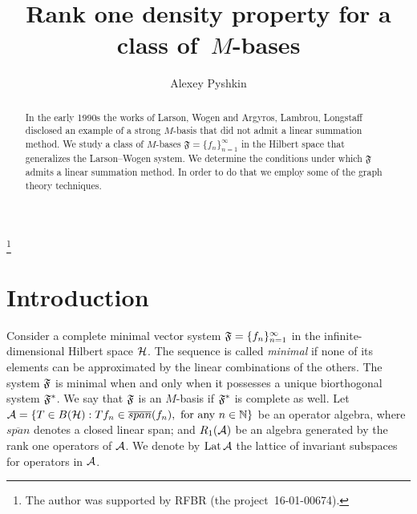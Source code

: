 \documentclass[12pt,oneside,a4paper]{amsart}
\begin{document}
\title{Rank one density property for a class of~$M$-bases}
\author{Alexey Pyshkin}
\begin{abstract}
  In the early 1990s the works of Larson, Wogen and Argyros, Lambrou, Longstaff
    disclosed an example of a strong $M$-basis that did not admit a linear summation method.
  We study a class of $M$-bases $\mathfrak{F}=\{f_n\}_{n=1}^\infty$ in the Hilbert space that
    generalizes the Larson--Wogen system.
  We determine the conditions under which $\mathfrak{F}$ admits a linear summation method.
  In order to do that we employ some of the graph theory techniques.
\end{abstract}
\thanks{The author was supported by RFBR (the project~16-01-00674).}
\maketitle

\section{Introduction}
  Consider a complete minimal vector system $\fsys = \seq{f}$ in the infinite-dimensional Hilbert space $\cal{H}$.
  The sequence is called \emph{minimal} if none of its elements can be approximated by the linear combinations of the others.
  The system $\fsys$ is minimal when and only when it possesses a unique biorthogonal system $\fstarsys$.
  We say that $\fsys$ is an $M$-basis if $\fstarsys$ is complete as well.
  Let ${\cal{A} = \{T\in B(\cal{H}): Tf_n \in \overline{span}(f_n), \text{ for any } n \in \mathbb{N}\}}$ be an operator algebra, where
    $\overline{span}$ denotes a closed linear span;
    and $R_1(\cal{A})$ be an algebra generated by the rank one operators of $\cal{A}$.
  We denote by $\lattice$ the lattice of invariant subspaces for operators in $\cal{A}$.
\end{document}
